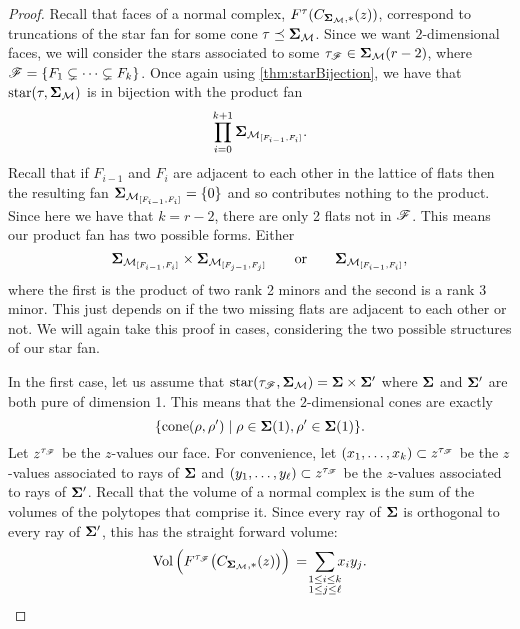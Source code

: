 \documentclass[12pt,oneside]{../../sfsuthesis}
\begin{document}
\begin{proof}
    Recall that faces of a normal complex, \( F^\tau(C_{\bm{\Sigma}_{\mathcal{M}}, \ast}(z)) \), correspond to truncations of the star fan for some cone  \( \tau \preceq \bm{\Sigma}_{\mathcal{M}} \).
    Since we want \( 2 \)-dimensional faces, we will consider the stars associated to some \( \tau_{\mathscr{F}} \in \bm{\Sigma}_{\mathcal{M}}(r - 2) \), where \( \mathscr{F} = \{ F_1 \subsetneq \cdots \subsetneq F_{k} \} \).
    Once again using \th\ref{thm:starBijection}, we have that \( \operatorname{star}(\tau, \bm{\Sigma}_{\mathcal{M}}) \) is in bijection with the product fan
    \[
        \prod_{i=0}^{k+1} \bm{\Sigma}_{\mathcal{M}_{[F_{i-1}, F_i]}}.
    \]
    Recall that if \( F_{i-1} \) and \( F_i \) are adjacent to each other in the lattice of flats then the resulting fan \( \bm{\Sigma}_{\mathcal{M}_{[F_{i-1}, F_i]}} = \{ 0 \} \) and so contributes nothing to the product.
    Since here we have that \( k = r - 2 \), there are only 2 flats not in \( \mathscr{F} \).
    This means our product fan has two possible forms. Either
    \[
        \bm{\Sigma}_{\mathcal{M}_{[F_{i-1}, F_i]}} \times \bm{\Sigma}_{\mathcal{M}_{[F_{j-1}, F_j]}}
        \quad \quad \text{or} \quad \quad
        \bm{\Sigma}_{\mathcal{M}_{[F_{i-1}, F_i]}},
    \]
    where the first is the product of two rank 2 minors and the second is a rank 3 minor.
    This just depends on if the two missing flats are adjacent to each other or not.
    We will again take this proof in cases, considering the two possible structures of our star fan.

    In the first case, let us assume that \( \operatorname{star}(\tau_{\mathscr{F}}, \bm{\Sigma}_{\mathcal{M}}) = \bm{\Sigma} \times \bm{\Sigma}' \) where  \( \bm{\Sigma} \) and  \( \bm{\Sigma}' \) are both pure of dimension 1.
    This means that the \( 2 \)-dimensional cones are exactly
    \[
        \{ \mathrm{cone}(\rho, \rho') \; | \; \rho \in \bm{\Sigma}(1), \rho' \in \bm{\Sigma}(1) \}.
    \]
    Let \( z^{\tau_{\mathscr{F}}} \) be the \( z \)-values our face.
    For convenience, let \( (x_1, \dots, x_k) \subset z^{\tau_{\mathscr{F}}} \) be the \( z \)-values associated to rays of \( \bm{\Sigma} \) and
    \( (y_1, \dots, y_\ell) \subset z^{\tau_{\mathscr{F}}} \) be the \( z \)-values associated to rays of \( \bm{\Sigma}' \).
    Recall that the volume of a normal complex is the sum of the volumes of the polytopes that comprise it.
    Since every ray of \( \bm{\Sigma} \) is orthogonal to every ray of \( \bm{\Sigma}' \), this has the straight forward volume:
    \[
        \Vol\Big(F^{\tau_\scrF}\big(C_{\bSigma_{\cM}, \ast}(z)\big)\Big) \, = \; \sum_{\mathclap{\substack{1 \leq i \leq k \\ 1 \leq j \leq \ell}}} x_i y_j.
    \]


\end{proof}
\end{document}
